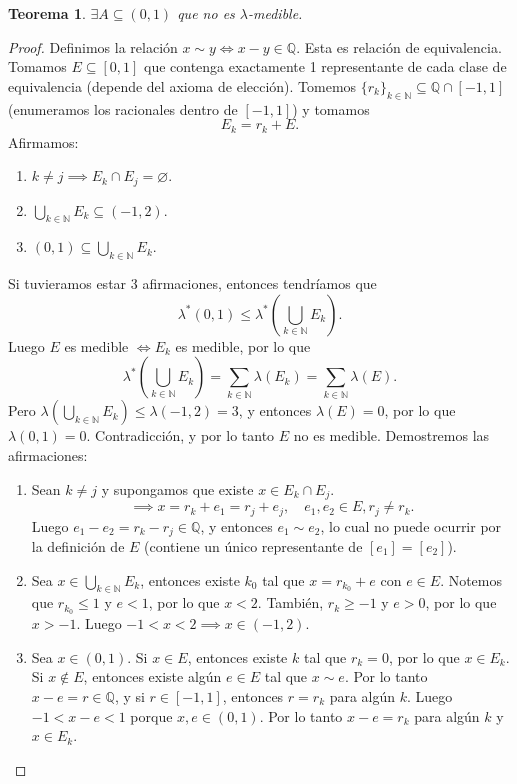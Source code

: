 \documentclass{article}
\newtheorem{theorem}{Teorema}[subsection]
\theoremstyle{definition}
\theoremstyle{remark}
\numberwithin{equation}{section}
\newcommand{\N}{\mathbb{N}}
\newcommand{\Q}{\mathbb{Q}}
\newcommand{\lam}{\lambda}
\newcommand{\br}[1]{\left( #1 \right)}
\newcommand{\ds}{\displaystyle}
\begin{document}
\begin{theorem}
  $\exists A \subseteq (0,1)$ que no es $\lam$-medible.
\end{theorem}
\begin{proof}
  Definimos la relación $x \sim y \iff x-y \in \Q$. Esta es relación de equivalencia.
  Tomamos $E \subseteq [0,1]$ que contenga exactamente 1 representante de cada clase de equivalencia (depende del axioma de elección).
  Tomemos $\{r_k\}_{k\in\N} \subseteq \Q \cap [-1,1]$ (enumeramos los racionales dentro de $[-1,1]$) y tomamos
  \[E_k = r_k + E.\]
  Afirmamos:
  \begin{enumerate}[(1)]
    \item $k \neq j \implies E_k \cap E_j = \varnothing$.
    \item $\ds \bigcup_{k \in \N} E_k \subseteq (-1,2)$.
    \item $(0,1) \subseteq \bigcup_{k \in \N} E_k$.
  \end{enumerate}
  Si tuvieramos estar 3 afirmaciones, entonces tendríamos que
  \[\lam^*(0,1) \leq \lam^*\br{\bigcup_{k\in\N} E_k}.\]
  Luego $E$ es medible $\iff E_k$ es medible, por lo que
  \[\lam^*\br{\bigcup_{k \in \N} E_k}  = \sum_{k \in \N} \lam(E_k) = \sum_{k \in \N} \lam(E).\]
  Pero $\lam\br{\bigcup_{k\in\N} E_k} \leq \lam(-1,2) = 3$, y entonces $\lam(E) = 0$, por lo que $\lam(0,1) = 0$. Contradicción, y por lo tanto $E$ no es medible.
  Demostremos las afirmaciones:
  \begin{enumerate}[(1)]
    \item Sean $k \neq j$ y supongamos que existe $x \in E_k \cap E_j$.
    \[\implies x = r_k + e_1 = r_j + e_j, \quad e_1, e_2 \in E, r_j \neq r_k.\]
    Luego $e_1 - e_2 = r_k - r_j \in \Q$, y entonces $e_1 \sim e_2$, lo cual no puede ocurrir por la definición de $E$ (contiene un único representante de $[e_1] = [e_2]$).
    \item Sea $\ds x \in \bigcup_{k \in \N} E_k$, entonces existe $k_0$ tal que $x = r_{k_0} + e$ con $e \in E$. Notemos que $r_{k_0} \leq 1$ y $e < 1$, por lo que $x < 2$. También, $r_k \geq -1$ y $e> 0$, por lo que $x > -1$. Luego $-1 < x < 2 \implies x \in (-1,2)$.
    \item Sea $x \in (0,1)$. Si $x \in E$, entonces existe $k$ tal que $r_k = 0$, por lo que $x \in E_k$. Si $x \notin E$, entonces existe algún $e \in E$ tal que $x \sim e$. Por lo tanto $x-e=r \in \Q$, y si $r \in [-1,1]$, entonces $r = r_k$ para algún $k$. Luego $-1 < x-e < 1$ porque $x,e \in (0,1)$. Por lo tanto $x-e = r_k$ para algún $k$ y $x \in E_k$.
  \end{enumerate}
\end{proof}
\end{document}
